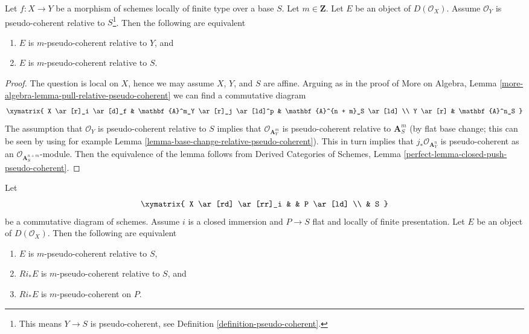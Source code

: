 \begin{lemma}
\label{lemma-composition-relative-pseudo-coherent}
Let $f : X \to Y$ be a morphism of schemes locally of finite type
over a base $S$. Let $m \in \mathbf{Z}$. Let $E$ be an object of
$D(\mathcal{O}_X)$. Assume $\mathcal{O}_Y$ is pseudo-coherent relative
to $S$\footnote{This means $Y \to S$ is pseudo-coherent, see
Definition \ref{definition-pseudo-coherent}.}.
Then the following are equivalent
\begin{enumerate}
\item $E$ is $m$-pseudo-coherent relative to $Y$, and
\item $E$ is $m$-pseudo-coherent relative to $S$.
\end{enumerate}
\end{lemma}

\begin{proof}
The question is local on $X$, hence we may assume $X$, $Y$, and $S$ are affine.
Arguing as in the proof of More on Algebra, Lemma
\ref{more-algebra-lemma-pull-relative-pseudo-coherent}
we can find a commutative diagram
$$
\xymatrix{
X \ar[r]_i \ar[d]_f &
\mathbf{A}^m_Y \ar[r]_j \ar[ld]^p &
\mathbf{A}^{n + m}_S \ar[ld] \\
Y \ar[r] &
\mathbf{A}^n_S
}
$$
The assumption that $\mathcal{O}_Y$ is pseudo-coherent relative to $S$
implies that $\mathcal{O}_{\mathbf{A}^m_Y}$ is pseudo-coherent relative
to $\mathbf{A}^m_S$ (by flat base change; this can be seen by using
for example Lemma \ref{lemma-base-change-relative-pseudo-coherent}).
This in turn implies that $j_*\mathcal{O}_{\mathbf{A}^n_Y}$ is
pseudo-coherent as an
$\mathcal{O}_{\mathbf{A}^{n + m}_S}$-module. Then the equivalence of
the lemma follows from
Derived Categories of Schemes, Lemma
\ref{perfect-lemma-closed-push-pseudo-coherent}.
\end{proof}

\begin{lemma}
\label{lemma-check-relative-pseudo-coherence-on-charts}
Let
$$
\xymatrix{
X \ar[rd] \ar[rr]_i & & P \ar[ld] \\
& S
}
$$
be a commutative diagram of schemes. Assume $i$ is a closed immersion
and $P \to S$ flat and locally of finite presentation. Let $E$
be an object of $D(\mathcal{O}_X)$. Then the following
are equivalent
\begin{enumerate}
\item $E$ is $m$-pseudo-coherent relative to $S$,
\item $Ri_*E$ is $m$-pseudo-coherent relative to $S$, and
\item $Ri_*E$ is $m$-pseudo-coherent on $P$.
\end{enumerate}
\end{lemma}

